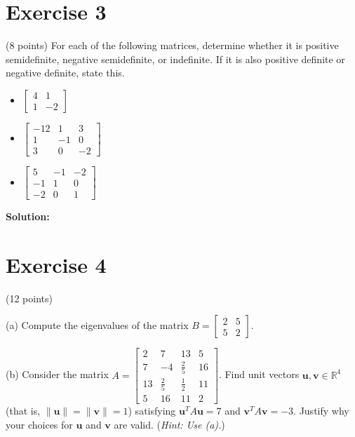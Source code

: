 \documentclass{article}
\begin{document}
\section{Exercise 3}
(8 points) For each of the following matrices, determine whether it is positive semidefinite, negative semidefinite, or indefinite. If it is also positive definite or negative definite, state this.
\begin{itemize}
\item $\begin{bmatrix} 4 & 1 \\ 1 & -2 \end{bmatrix}$

\item $\begin{bmatrix} -12 & 1 & 3 \\ 1 & -1 & 0 \\ 3 & 0 & -2 \end{bmatrix}$

\item $\begin{bmatrix} 5 & -1 & -2 \\ -1 & 1 & 0 \\ -2 & 0 & 1 \end{bmatrix}$
\end{itemize}

\textbf{Solution: } \\



\newpage

\section{Exercise 4}
(12 points)

(a) Compute the eigenvalues of the matrix $B = \begin{bmatrix} 2 & 5 \\ 5 & 2 \end{bmatrix}$.

(b) Consider the matrix $A = \begin{bmatrix} 2 & 7 & 13 & 5 \\ 7 & -4 & \frac{2}{5} & 16 \\ 13 & \frac{2}{5} & \frac{1}{2} & 11 \\ 5 & 16 & 11 & 2 \end{bmatrix}$. Find unit vectors $\mathbf{u}, \mathbf{v} \in \mathbb{R}^4$ (that is, $\|\mathbf{u}\| = \|\mathbf{v}\| = 1$) satisfying $\mathbf{u}^T A\mathbf{u} = 7$ and $\mathbf{v}^T A\mathbf{v} = -3$. Justify why your choices for $\mathbf{u}$ and $\mathbf{v}$ are valid.
(\textit{Hint: Use (a).}) \\
\end{document}
